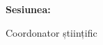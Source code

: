 \begin{titlepage}
    \begin{center}
        \large
        \MakeUppercase{\university}
        
        \LARGE
        \textbf{\MakeUppercase{\faculty}}
        
        \vspace{5cm}
        \huge
        \textbf{\thesistitle}
        
        \vspace{2cm}
        \LARGE
        \textbf{\authornamefl}
        
        \vfill
        \Large
        \textbf{Sesiunea:} \session
        
        \vspace{4cm}
        \Large
        Coordonator științific
        
        \vspace{0.5cm}
        \LARGE
        \textbf{\coordinator}
    \end{center}
\end{titlepage}